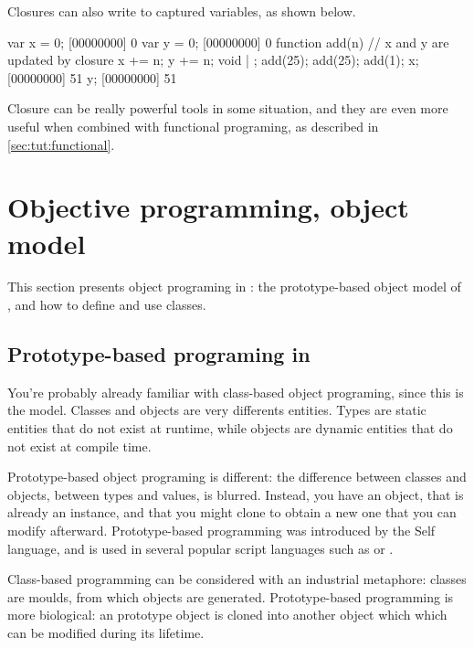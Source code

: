 Closures can also write to captured variables, as shown below.

\begin{urbiscript}
var x = 0;
[00000000] 0
var y = 0;
[00000000] 0
function add(n)
{
  // x and y are updated by closure
  x += n;
  y += n;
  void
} | {};
add(25);
add(25);
add(1);
x;
[00000000] 51
y;
[00000000] 51
\end{urbiscript}

Closure can be really powerful tools in some situation, and they are
even more useful when combined with functional programing, as
described in \autoref{sec:tut:functional}.


\chapter{Objective programming, \us object model}
\label{sec:tut:object}

This section presents object programing in \us: the prototype-based
object model of \us, and how to define and use classes.

\section{Prototype-based programing in \us}

You're probably already familiar with class-based object programing,
since this is the \Cxx model.  Classes and objects are very differents
entities.  Types are static entities that do not exist at runtime,
while objects are dynamic entities that do not exist at compile time.

Prototype-based object programing is different: the difference between
classes and objects, between types and values, is blurred. Instead,
you have an
object, that is already an instance, and that you might clone to
obtain a new one that you can modify afterward. Prototype-based
programming was introduced by the Self language, and is used in
several popular script languages such as \io or \js.

Class-based programming can be considered with an industrial
metaphore: classes are moulds, from which objects are generated.
Prototype-based programming is more biological: an prototype object is
cloned into another object which which can be modified during its
lifetime.

